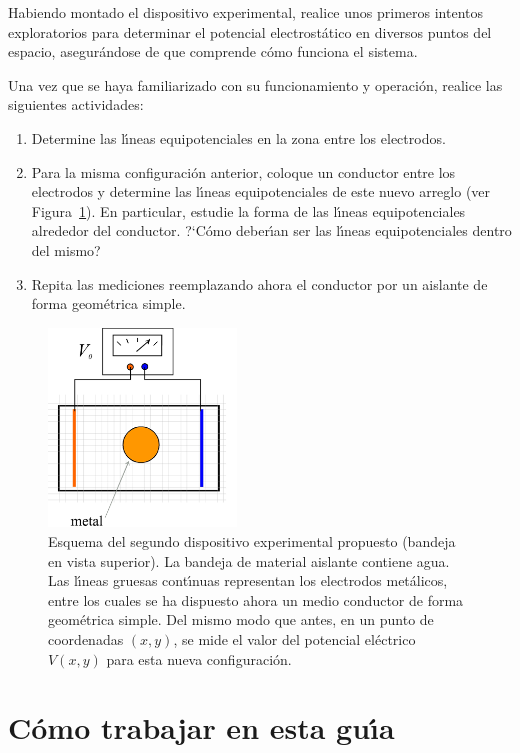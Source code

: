 \documentclass[laboratorio]{guia}
\begin{document}
Habiendo montado el dispositivo experimental, realice unos primeros intentos
exploratorios para determinar el potencial electrost\'atico en diversos puntos
del espacio, asegur\'andose de que comprende c\'omo funciona el sistema. 

Una vez que se haya familiarizado con su funcionamiento y operaci\'on, realice
las siguientes actividades:
\begin{enumerate}
    \item Determine las l\'\i neas equipotenciales en la zona entre los electrodos.
    \item Para la misma configuraci\'on anterior, coloque un conductor entre los 
        electrodos y determine las l\'\i neas equipotenciales de este nuevo 
        arreglo (ver Figura~\ref{fig:2}). En particular, estudie la forma de las  l\'\i neas 
        equipotenciales alrededor del conductor. ?`C\'omo deber\'\i an ser las 
        l\'\i neas equipotenciales dentro del mismo?  
    \item Repita las mediciones reemplazando ahora el conductor por un aislante de forma
        geom\'etrica simple.
\end{enumerate}


\begin{figure}[t!]
    \centering
\includegraphics[width=5cm]{LG01--001.png}
\caption{Esquema del segundo dispositivo experimental propuesto (bandeja en vista
superior). La bandeja de material aislante contiene agua. Las l\'\i neas
gruesas cont\'\i nuas representan los electrodos met\'alicos, entre los cuales
se ha dispuesto ahora un medio conductor de forma geom\'etrica simple. Del mismo
modo que antes, en un punto
de coordenadas $(x,y)$, se mide el valor del potencial el\'ectrico $V(x,y)$
para esta nueva configuraci\'on.}
    \label{fig:2}
\end{figure}

\section{C\'omo trabajar en esta gu\'\i a}
\end{document}
